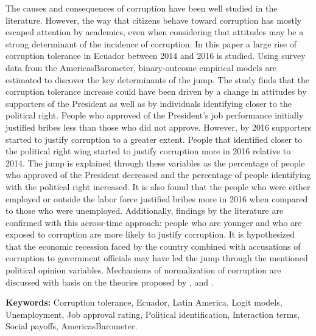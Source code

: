 \documentclass[floatsintext,man]{apa7}\usepackage[]{graphicx}\usepackage[]{color}
\begin{document}
The causes and consequences of corruption have been well studied in the literature. However, the way that citizens behave toward corruption has mostly escaped attention by academics, even when considering that attitudes may be a strong determinant of the incidence of corruption. In this paper a large rise of corruption tolerance in Ecuador between 2014 and 2016 is studied. Using survey data from the AmericasBarometer, binary-outcome empirical models are estimated to discover the key determinants of the jump. The study finds that the corruption tolerance increase could have been driven by a change in attitudes by supporters of the President as well as by individuals identifying closer to the political right. People who approved of the President's job performance initially justified bribes less than those who did not approve. However, by 2016 supporters started to justify corruption to a greater extent. People that identified closer to the political right wing started to justify corruption more in 2016 relative to 2014. The jump is explained through these variables as the percentage of people who approved of the President decreased and the percentage of people identifying with the political right increased. It is also found that the people who were either employed or outside the labor force justified bribes more in 2016 when compared to those who were unemployed. Additionally, findings by the literature are confirmed with this across-time approach: people who are younger and who are exposed to corruption are more likely to justify corruption. It is hypothesized that the economic recession faced by the country combined with accusations of corruption to government officials may have led the jump through the mentioned political opinion variables. Mechanisms of normalization of corruption are discussed with basis on the theories proposed by \textcite{Ashforth.2003}, \textcite{Hurtado.2007} and \textcite{Adoum.2000}. 

\noindent \textbf{Keywords:} Corruption tolerance, Ecuador, Latin America, Logit models, Unemployment, Job approval rating, Political identification, Interaction terms, Social payoffs, AmericasBarometer. 

\clearpage

\clearpage
\tableofcontents %
\clearpage 
\listoftables %
\clearpage
\listoffigures %
\clearpage
\end{document}
